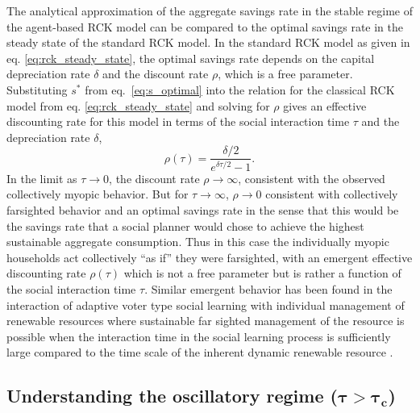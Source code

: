 The analytical approximation of the aggregate savings rate in the stable regime of the agent-based RCK model can be compared to the optimal savings rate in the steady state of the standard RCK model.
In the standard RCK model as given in eq. \ref{eq:rck_steady_state}, the optimal savings rate depends on the capital depreciation rate $\delta$ and the discount rate $\rho$, which is a free parameter. Substituting $s^\ast$ from eq.~\eqref{eq:s_optimal} into the relation for the classical RCK model from eq. \eqref{eq:rck_steady_state} and solving for $\rho$ gives an effective discounting rate for this model in terms of the social interaction time $\tau$ and the depreciation rate $\delta$,
\begin{equation}
   \rho(\tau) = \frac{\delta/2}{e^{\delta \tau/2} - 1}. \label{eq:rhotau}
\end{equation}
In the limit as $\tau \to 0$, the discount rate $\rho \to \infty$, consistent with the observed collectively myopic behavior. But for $\tau \to \infty$, $\rho \to 0$ consistent with collectively farsighted behavior and an optimal savings rate in the sense that this would be the savings rate that a social planner would chose to achieve the highest sustainable aggregate consumption.  
Thus in this case the individually myopic households act collectively ``as if'' they were farsighted, with an emergent effective discounting rate $\rho(\tau)$ which is not a free parameter but is rather a function of the social interaction time $\tau$.
Similar emergent behavior has been found in the interaction of adaptive voter type social learning with individual management of renewable resources where sustainable far sighted management of the resource is possible when the interaction time in the social learning process is sufficiently large compared to the time scale of the inherent dynamic renewable resource \citep{Wiedermann2015}. 


\subsection{Understanding the oscillatory regime ($\mathbf{\tau \!>\! \tau_{c} }$)}


